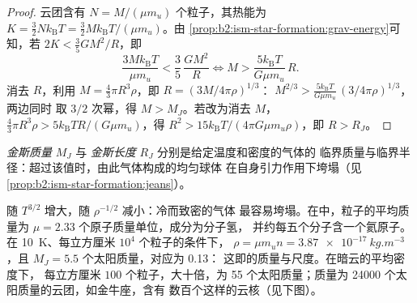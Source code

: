 \begin{proof}
云团含有 $N = M/(\mu m_u)$ 个粒子，其热能为
$K = \tfrac32 N k_{\mathrm B}T = \tfrac32 M k_{\mathrm B}T/(\mu m_u)$。由
\cref{prop:b2:ism-star-formation:grav-energy}可知，若
$2K < \tfrac35 GM^2/R$，即
\[
  \frac{3 M k_{\mathrm B} T}{\mu m_u} < \frac{3}{5}\,\frac{G M^2}{R}
  \iff M > \frac{5 k_{\mathrm B} T}{G \mu m_u}\, R .
\]
消去 $R$，利用 $M = \tfrac43\pi R^3\rho$，即 $R = (3M/4\pi\rho)^{1/3}$：
$M^{2/3} > \frac{5 k_{\mathrm B}T}{G\mu m_u}\,(3/4\pi\rho)^{1/3}$，两边同时
取 $3/2$ 次幂，得 $M > M_J$。若改为消去 $M$，
$\tfrac43\pi R^3\rho > 5 k_{\mathrm B}T R/(G\mu m_u)$，得 $R^2 > 15
k_{\mathrm B}T/(4\pi G\mu m_u\rho)$，即 $R > R_J$。
\end{proof}

\begin{definition}\label{def:b2:ism-star-formation:jeans}
\emph{金斯质量} $M_J$ 与
\emph{金斯长度} $R_J$ 分别是给定温度和密度的气体的
临界质量与临界半径：超过该值时，由此气体构成的均匀球体
在自身引力作用下垮塌（见\cref{prop:b2:ism-star-formation:jeans}）。
\end{definition}

随 $T^{3/2}$ 增大，随 $\rho^{-1/2}$ 减小：冷而致密的气体
最容易垮塌。在中，粒子的平均质量为
$\mu = 2.33$ 个原子质量单位，成分为分子氢，
并约每五个分子含一个氦原子。在 \qty{10}{K}、每立方厘米 $10^4$ 个粒子的条件下，
$\rho = \mu m_u n = \qty{3.87e-17}{kg.m^{-3}}$，且
$M_J = 5.5$ 个太阳质量，对应为 \qty{0.13}{\parsec}：
这即的质量与尺度。在暗云的平均密度下，
每立方厘米 $100$ 个粒子，大十倍，为 55
个太阳质量；质量为 \num{24000} 个太阳质量的云团，如金牛座，含有
数百个这样的云核（见下图）。

